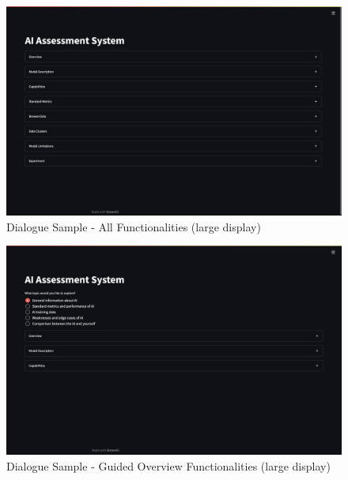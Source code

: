 \documentclass[11pt,a4paper,english]{scrreprt}
\begin{document}
\begin{figure}[htbp]
    \centering
    \includegraphics[width=\textwidth]{img/screenshots/samples/large/l_all.png}
    \caption{Dialogue Sample - All Functionalities (large display)}
    \label{fig:samples_l_all}
\end{figure}

\begin{figure}[htbp]
    \centering
    \includegraphics[width=\textwidth]{img/screenshots/samples/large/l_overview_guided.png}
    \caption{Dialogue Sample - Guided Overview Functionalities (large display)}
    \label{fig:samples_l_overview_guided}
\end{figure}
\end{document}
